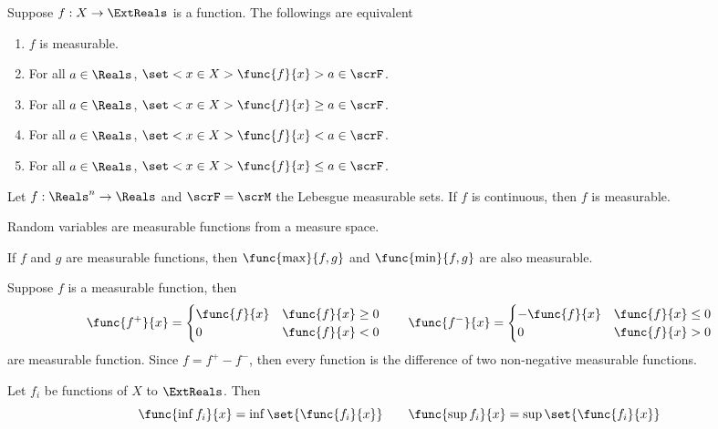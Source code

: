 \begin{lemma}
    Suppose \(f: X \to \ExtReals\) is a function. The followings are equivalent 
    \begin{enumerate}
        \item \(f\) is measurable. 
        \item For all \(a \in \Reals\), \(\set<x \in X>{\func{f}{x} > a} \in \scrF\).
        \item For all \(a \in \Reals\), \(\set<x \in X>{\func{f}{x} \geq a} \in \scrF\).
        \item  For all \(a \in \Reals\), \(\set<x \in X>{\func{f}{x} < a} \in \scrF\).
        \item For all \(a \in \Reals\), \(\set<x \in X>{\func{f}{x} \leq a} \in \scrF\).
    \end{enumerate}
\end{lemma}

\begin{example}
    Let \(f:\Reals^n \to \Reals\) and \(\scrF = \scrM\) the Lebesgue measurable sets. If \(f\) is continuous, then \(f\) is measurable. 
\end{example}

Random variables are measurable functions from a measure space. 

\begin{theorem}
    If \(f\) and \(g\) are measurable functions, then \(\func{\max}{f,g}\) and \(\func{\min}{f,g}\) are also measurable. 
\end{theorem}

\begin{corollary}
    Suppose \(f\) is a measurable function, then 
    \begin{equation*}
        \func{f^+}{x} = \begin{cases}
            \func{f}{x} & \func{f}{x} \geq 0 \\
            0 & \func{f}{x} < 0
        \end{cases}
        \qquad 
        \func{f^-}{x} = \begin{cases}
            -\func{f}{x} & \func{f}{x} \leq 0 \\
            0 & \func{f}{x} > 0
        \end{cases}
    \end{equation*}
    are measurable function. Since \(f = f^+ - f^-\), then every function is the difference of two non-negative measurable functions.
\end{corollary}

\begin{definition}
    Let \(f_i\) be functions of \(X\) to \(\ExtReals\). Then 
    \begin{equation*}
        \func{\inf f_i}{x} = \inf \set{\func{f_i}{x}} \qquad \func{\sup f_i}{x} = \sup \set{\func{f_i}{x}}
    \end{equation*}
\end{definition}

